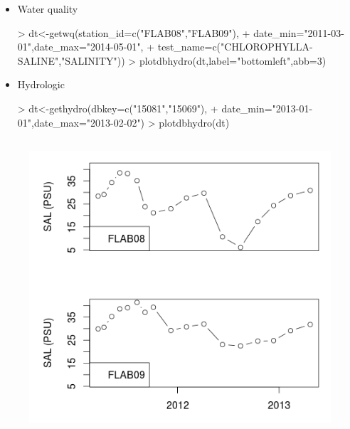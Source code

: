 \documentclass[12pt,notitlepage]{article}
\begin{document}
\begin{itemize}

\item{Water quality}
\begin{Schunk}
\begin{Sinput}
> dt<-getwq(station_id=c("FLAB08","FLAB09"),
+                 date_min="2011-03-01",date_max="2014-05-01",
+                 test_name=c("CHLOROPHYLLA-SALINE","SALINITY"))
> plotdbhydro(dt,label="bottomleft",abb=3)
\end{Sinput}
\end{Schunk}


\item{Hydrologic}
\begin{Schunk}
\begin{Sinput}
> dt<-gethydro(dbkey=c("15081","15069"),
+              date_min="2013-01-01",date_max="2013-02-02")
> plotdbhydro(dt)
\end{Sinput}
\end{Schunk}
\end{itemize}

\vspace{2pt}
\begin{figure}[H]
\begin{center}
\includegraphics[width=343.5pt,height=310.8pt]{Rplot}
\end{center}
\label{fig:zero}
\end{figure}
\end{document}
